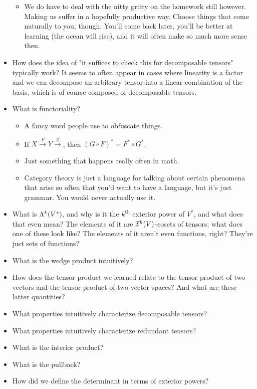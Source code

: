 \documentclass[../notes.tex]{subfiles}
\begin{document}
\begin{itemize}
\begin{itemize}
        \item We do have to deal with the nitty gritty on the homework still however. Making us suffer in a hopefully productive way. Choose things that come naturally to you, though. You'll come back later, you'll be better at learning (the ocean will rise), and it will often make so much more sense then.
    \end{itemize}
    \item How does the idea of "it suffices to check this for decomposable tensors" typically work? It seems to often appear in cases where linearity is a factor and we can decompose an arbitrary tensor into a linear combination of the basis, which is of course composed of decomposable tensors.
    \item What is functoriality?
    \begin{itemize}
        \item A fancy word people use to obfuscate things.
        \item If $X\xrightarrow{F}Y\xrightarrow{Z}$, then $(G\circ F)^*=F^*\circ G^*$.
        \item Just something that happens really often in math.
        \item Category theory is just a language for talking about certain phenomena that arise so often that you'd want to have a language, but it's just grammar. You would never actually use it.
    \end{itemize}
    \item What is $\lam[k]{V^*}$, and why is it the $k^\text{th}$ exterior power of $V^*$, and what does that even mean? The elements of it are $\ide[k]{V}$-cosets of tensors; what does one of these look like? The elements of it aren't even functions, right? They're just sets of functions?
    \item What is the wedge product intuitively?
    \item How does the tensor product we learned relate to the tensor product of two vectors and the tensor product of two vector spaces? And what are these latter quantities?
    \item What properties intuitively characterize decomposable tensors?
    \item What properties intuitively characterize redundant tensors?
    \item What is the interior product?
    \item What is the pullback?
    \item How did we define the determinant in terms of exterior powers?

\end{itemize}
\end{document}

